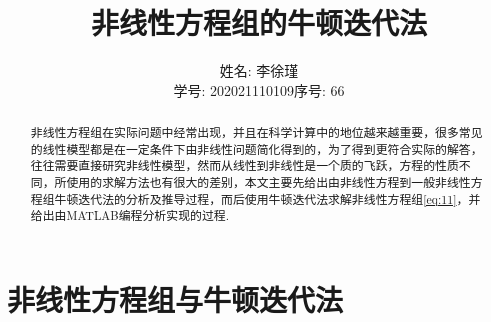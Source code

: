 \documentclass[cn,12pt,founder,a4paper]{elegantpaper}
\title{非线性方程组的牛顿迭代法}
\author{\kaishu 姓名: 李徐瑾\\ \kaishu 学号: 202021110109\qquad 序号: 66}
\date{\zhtoday}
\institute{\gt 电子科技大学数学科学学院}
\begin{document}
\maketitle

\begin{abstract}
非线性方程组在实际问题中经常出现，并且在科学计算中的地位越来越重要，很多常见的线性模型都是在一定条件下由非线性问题简化得到的，为了得到更符合实际的解答，往往需要直接研究非线性模型，然而从线性到非线性是一个质的飞跃，方程的性质不同，所使用的求解方法也有很大的差别，本文主要先给出由非线性方程到一般非线性方程组牛顿迭代法的分析及推导过程，而后使用牛顿迭代法求解非线性方程组\eqref{eq:11}，并给出由M{\footnotesize{ATLAB}}编程分析实现的过程. 
\end{abstract}

\section{非线性方程组与牛顿迭代法}
\end{document}
